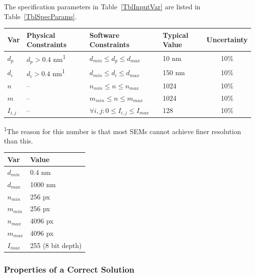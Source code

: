 \documentclass[12pt]{article}
\begin{document}
The specification parameters in Table~\ref{TblInputVar} are listed in
Table~\ref{TblSpecParams}.

\begin{table}[!h]
  \caption{Input Variables} \label{TblInputVar}
  \renewcommand{\arraystretch}{1.2}
\noindent \begin{longtable*}{l l l l c} 
  \toprule
  \textbf{Var} & \textbf{Physical Constraints} & \textbf{Software Constraints} &
                             \textbf{Typical Value} & \textbf{Uncertainty}\\
  \midrule 
  $d_p$ & $d_p > 0.4$ \si{nm}\textsuperscript{1} & $d_{min} \leq d_p \leq d_{max}$ & 10 \si{nm} & 10\% \\
  $d_i$ & $d_i > 0.4$ \si{nm}\textsuperscript{1} & $d_{min} \leq d_i \leq d_{max}$ & 150 \si{nm} & 10\% \\
  $n$ & -- & $n_{min} \leq n \leq n_{max}$ & 1024 & 10\% \\
  $m$ & -- & $m_{min} \leq n \leq m_{max}$ & 1024 & 10\% \\
  $I_{i,j}$ & -- & $\forall i,j: 0 \leq I_{i,j} \leq I_{max}$ & 128 & 10\% \\
  \bottomrule
\end{longtable*}
\begin{tablenotes}
  \small
  \item \textsuperscript{1}The reason for this number is that most SEMs cannot achieve finer resolution than this.
\end{tablenotes}
\end{table}

\begin{table}[!h]
\caption{Specification Parameter Values} \label{TblSpecParams}
\renewcommand{\arraystretch}{1.2}
\noindent \begin{longtable*}{l l} 
  \toprule
  \textbf{Var} & \textbf{Value} \\
  \midrule 
  $d_{min}$ & 0.4 \si{\nm}\\
  $d_{max}$ & 1000 \si{\nm}\\
  $n_{min}$ & 256 px\\
  $m_{min}$ & 256 px\\
  $n_{max}$ & 4096 px\\
  $m_{max}$ & 4096 px\\
  $I_{max}$ & 255 (8 bit depth)\\
  \bottomrule
\end{longtable*}
\end{table}

\subsubsection{Properties of a Correct Solution} \label{sec_CorrectSolution}
\end{document}
